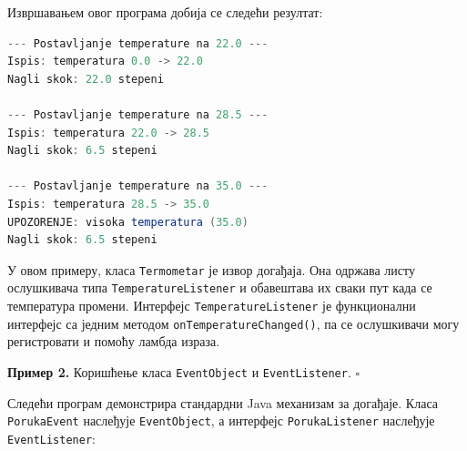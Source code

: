 Извршавањем овог програма добија се следећи резултат:


\begin{lstlisting}[language=Java]
--- Postavljanje temperature na 22.0 ---
Ispis: temperatura 0.0 -> 22.0
Nagli skok: 22.0 stepeni
 
--- Postavljanje temperature na 28.5 ---
Ispis: temperatura 22.0 -> 28.5
Nagli skok: 6.5 stepeni
 
--- Postavljanje temperature na 35.0 ---
Ispis: temperatura 28.5 -> 35.0
UPOZORENJE: visoka temperatura (35.0)
Nagli skok: 6.5 stepeni
\end{lstlisting}


У овом примеру, класа \texttt{Termometar} је извор догађаја. Она одржава листу ослушкивача типа \texttt{TemperatureListener} и обавештава их сваки пут када се температура промени. Интерфејс \texttt{TemperatureListener} је функционални интерфејс са једним методом \texttt{onTemperatureChanged()}, па се ослушкивачи могу регистровати и помоћу ламбда израза.


\bigskip

\noindent \textbf{Пример 2.} Коришћење класа \texttt{EventObject} и \texttt{EventListener}. $\square$

\medskip

Следећи програм демонстрира стандардни Java механизам за догађаје. Класа \texttt{PorukaEvent} наслеђује \texttt{EventObject}, а интерфејс \texttt{PorukaListener} наслеђује \texttt{EventListener}:


